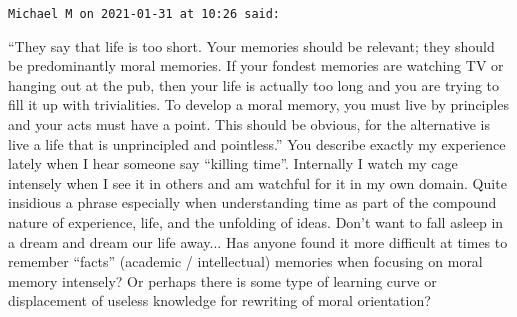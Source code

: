 \begin{footnotesize}
\begin{sffamily}
\texttt{Michael M on 2021-01-31 at 10:26 said:}

``They say that life is too short. Your memories should be relevant; they should be predominantly moral memories. If your fondest memories are watching TV or hanging out at the pub, then your life is actually too long and you are trying to fill it up with trivialities. To develop a moral memory, you must live by principles and your acts must have a point. This should be obvious, for the alternative is live a life that is unprincipled and pointless.'' You describe exactly my experience lately when I hear someone say ``killing time''. Internally I watch my cage intensely when I see it in others and am watchful for it in my own domain. Quite insidious a phrase especially when understanding time as part of the compound nature of experience, life, and the unfolding of ideas. Don't want to fall asleep in a dream and dream our life away... Has anyone found it more difficult at times to remember ``facts'' (academic / intellectual) memories when focusing on moral memory intensely? Or perhaps there is some type of learning curve or displacement of useless knowledge for rewriting of moral orientation?

\end{sffamily}
\end{footnotesize}
